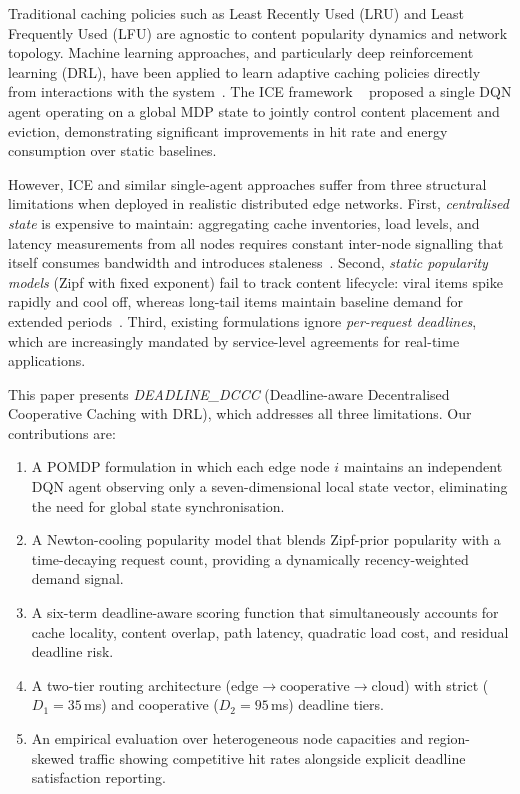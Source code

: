 \documentclass[conference]{IEEEtran}
\begin{document}
Traditional caching policies such as Least Recently Used (LRU) and
Least Frequently Used (LFU) are agnostic to content popularity
dynamics and network topology.  Machine learning approaches, and
particularly deep reinforcement learning (DRL), have been applied to
learn adaptive caching policies directly from interactions with the
system~\cite{sadeghi2019optimal,zhong2020deep}.  The ICE framework
~\cite{ice2022} proposed a single DQN agent operating on a global MDP
state to jointly control content placement and eviction, demonstrating
significant improvements in hit rate and energy consumption over static
baselines.

However, ICE and similar single-agent approaches suffer from three
structural limitations when deployed in realistic distributed edge
networks.  First, \emph{centralised state} is expensive to maintain:
aggregating cache inventories, load levels, and latency measurements
from all nodes requires constant inter-node signalling that itself
consumes bandwidth and introduces staleness~\cite{liu2019decentralised}.
Second, \emph{static popularity models} (Zipf with fixed exponent) fail
to track content lifecycle: viral items spike rapidly and cool off,
whereas long-tail items maintain baseline demand for extended
periods~\cite{traverso2013temporal}.  Third, existing formulations
ignore \emph{per-request deadlines}, which are increasingly mandated by
service-level agreements for real-time applications.

This paper presents \emph{DEADLINE\_DCCC} (Deadline-aware
Decentralised Cooperative Caching with DRL), which addresses all three
limitations.  Our contributions are:

\begin{enumerate}
  \item A POMDP formulation in which each edge node $i$ maintains an
    independent DQN agent observing only a seven-dimensional local
    state vector, eliminating the need for global state
    synchronisation.
  \item A Newton-cooling popularity model that blends Zipf-prior
    popularity with a time-decaying request count, providing a
    dynamically recency-weighted demand signal.
  \item A six-term deadline-aware scoring function that simultaneously
    accounts for cache locality, content overlap, path latency,
    quadratic load cost, and residual deadline risk.
  \item A two-tier routing architecture ($\mathrm{edge} \to
    \mathrm{cooperative} \to \mathrm{cloud}$) with strict
    ($D_1 = 35$\,ms) and cooperative ($D_2 = 95$\,ms) deadline tiers.
  \item An empirical evaluation over heterogeneous node capacities and
    region-skewed traffic showing competitive hit rates alongside
    explicit deadline satisfaction reporting.
\end{enumerate}
\end{document}
